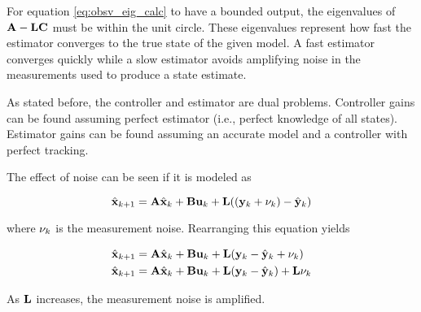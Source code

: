 For equation \eqref{eq:obsv_eig_calc} to have a bounded output, the eigenvalues
of $\mathbf{A} - \mathbf{L}\mathbf{C}$ must be within the unit circle. These eigenvalues
represent how fast the estimator converges to the true \gls{state} of the given
\gls{model}. A fast estimator converges quickly while a slow estimator avoids
amplifying noise in the measurements used to produce a \gls{state} estimate.

As stated before, the controller and estimator are dual problems. Controller
gains can be found assuming perfect estimator (i.e., perfect knowledge of all
\glspl{state}). Estimator gains can be found assuming an accurate \gls{model}
and a controller with perfect \gls{tracking}.

The effect of noise can be seen if it is modeled
 as

\begin{equation*}
  \hat{\mathbf{x}}_{k+1} = \mathbf{A}\hat{\mathbf{x}}_k + \mathbf{B}\mathbf{u}_k +
    \mathbf{L} ((\mathbf{y}_k + \mathbf{\nu}_k) - \hat{\mathbf{y}}_k) \\
\end{equation*}

where $\mathbf{\nu}_k$ is the measurement noise. Rearranging this equation yields

\begin{align*}
  \hat{\mathbf{x}}_{k+1} &= \mathbf{A}\hat{\mathbf{x}}_k + \mathbf{B}\mathbf{u}_k +
    \mathbf{L} (\mathbf{y}_k - \hat{\mathbf{y}}_k + \mathbf{\nu}_k) \\
  \hat{\mathbf{x}}_{k+1} &= \mathbf{A}\hat{\mathbf{x}}_k + \mathbf{B}\mathbf{u}_k +
    \mathbf{L} (\mathbf{y}_k - \hat{\mathbf{y}}_k) + \mathbf{L}\mathbf{\nu}_k
\end{align*}

As $\mathbf{L}$ increases, the measurement noise is amplified.

